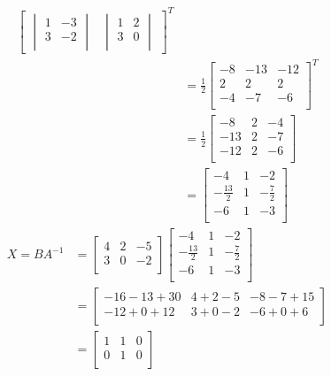 \documentclass[11pt]{article}
\begin{document}
\begin{align*}
\begin{bmatrix}
\begin{vmatrix}
                               1 & -3 \\
                               3 & -2\\
                             \end{vmatrix}
                          &\begin{vmatrix}
                             1 & 2\\
                             3 & 0\\
                           \end{vmatrix}
                        \end{bmatrix}^{T}
  \\
         &=\frac{1}{2}
           \begin{bmatrix}
             -8 & -13 & -12\\
             2 & 2 & 2\\
             -4 & -7 & -6\\
           \end{bmatrix}^{T}
\\
         &=\frac{1}{2}
           \begin{bmatrix}
             -8 &  2 & -4\\
             -13 & 2 & -7\\
             -12 & 2 & -6\\
           \end{bmatrix}
  \\
         &= \begin{bmatrix}
              -4 & 1 & -2\\
              -\frac{13}{2} & 1 & - \frac{7}{2}\\
              -6 & 1 & -3\\
            \end{bmatrix}
\end{align*}
\begin{align*}
  X = BA^{-1} &= \begin{bmatrix}
                   4 & 2 & -5\\
                   3 & 0 & -2\\
                 \end{bmatrix}
  \begin{bmatrix}
    -4 & 1 & -2\\
    -\frac{13}{2} & 1 & - \frac{7}{2}\\
    -6 & 1 & -3\\
  \end{bmatrix}
  \\
              &= \begin{bmatrix}
                   -16 - 13 + 30 & 4 + 2 - 5 & - 8 - 7 + 15\\
                   -12 + 0 + 12  & 3 + 0 - 2 & - 6 +0 +6 \\
                 \end{bmatrix}
  \\
              &= \begin{bmatrix}
                   1 & 1 & 0\\
                   0 & 1 & 0\\
                 \end{bmatrix}
\end{align*}
\end{document}
